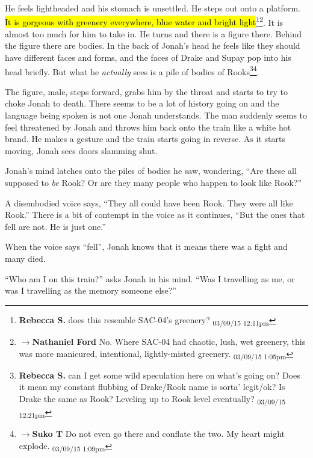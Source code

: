 He feels lightheaded and his stomach is unsettled.  He steps out onto a platform.  \hl{It is gorgeous with greenery everywhere, blue water and bright light}\footnote{\textbf{Rebecca S. }does this resemble SAC-04's greenery? \textsubscript{03/09/15 12:11pm}}\footnote{$\rightarrow$\textbf{Nathaniel Ford }No. Where SAC-04 had chaotic, lush, wet greenery, this was more manicured, intentional, lightly-misted greenery. \textsubscript{03/09/15 1:05pm}}.  It is almost too much for him to take in.  He turns and there is a figure there.  Behind the figure there are bodies.  In the back of Jonah's head he feels like they should have different faces and forms, and the faces of Drake and Supay pop into his head briefly.  But what he \textit{actually} sees is a pile of bodies of Rooks\footnote{\textbf{Rebecca S. }can I get some wild speculation here on what's going on?  Does it mean my constant flubbing of Drake/Rook name is sorta' legit/ok?  Is Drake the same as Rook? Leveling up to Rook level eventually? \textsubscript{03/09/15 12:21pm}}\footnote{$\rightarrow$\textbf{Suko T }Do not even go there and conflate the two.  My heart might explode. \textsubscript{03/09/15 1:09pm}}.



The figure, male, steps forward, grabs him by the throat and starts to try to choke Jonah to death.  There seems to be a lot of history going on and the language being spoken is not one Jonah understands.  The man suddenly seems to feel threatened by Jonah and throws him back onto the train like a white hot brand.  He makes a gesture and the train starts going in reverse. As it starts moving, Jonah sees doors slamming shut.



Jonah's mind latches onto the piles of bodies he saw, wondering, ``Are these all supposed to \textit{be} Rook? Or are they many people who happen to look like Rook?''

A disembodied voice says, ``They all could have been Rook.  They were all like Rook.'' There is a bit of contempt in the voice as it continues, ``But the ones that fell are not.  He is just one.''

When the voice says ``fell'', Jonah knows that it means there was a fight and many died.

``Who am I on this train?'' asks Jonah in his mind.  ``Was I travelling as me, or was I travelling as the memory someone else?''

